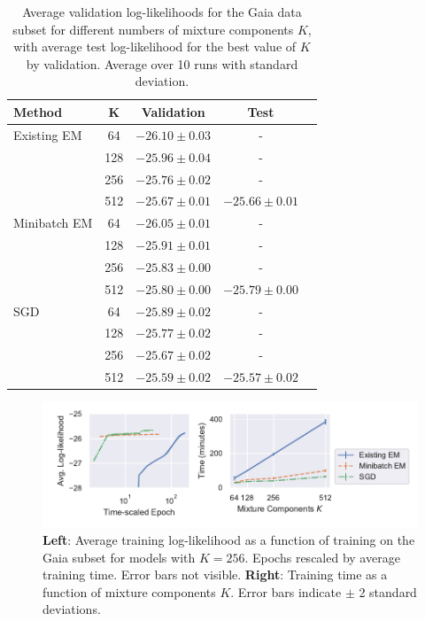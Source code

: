 \documentclass{article}
\begin{document}
\begin{table}{}
  \caption{Average validation log-likelihoods for the Gaia data subset for different numbers of mixture components $K$, with average test log-likelihood for the best value of $K$ by validation. Average over 10 runs with standard deviation.}
  \label{results-table}
  \centering
  \begin{tabular}{lcccc}
      \toprule
      Method     & K &  Validation     & Test\\
      \midrule
      Existing EM & 64 & $-26.10 \pm 0.03$ & - \\
      \citet{bovyExtremeDeconvolutionInferring2011} & 128 & $-25.96 \pm 0.04$ & - \\
       & 256 & $-25.76 \pm 0.02$ & - \\
       & 512 & $-25.67 \pm 0.01$ & $-25.66 \pm 0.01$ \\
      \midrule
      Minibatch EM & 64 & $-26.05 \pm 0.01$ & - \\
       & 128 & $-25.91 \pm 0.01$ & - \\
       & 256 & $-25.83 \pm 0.00$ & - \\
       & 512 & $-25.80 \pm 0.00$ & $-25.79 \pm 0.00$ \\
      \midrule
      SGD & 64 & $-25.89 \pm 0.02$ & - \\
       & 128 & $-25.77 \pm 0.02$ & - \\
       & 256 & $-25.67 \pm 0.02$ & - \\
       & 512 & $-25.59 \pm 0.02$ & $-25.57 \pm 0.02$ \\
      \bottomrule
  \end{tabular}
\end{table}

\begin{figure}
  \centering
  \includegraphics[width=\textwidth]{figures/learning.pdf}
  \caption{\textbf{Left}: Average training log-likelihood as a function of training on the Gaia subset for models with $K=256$. Epochs rescaled by average training time. Error bars not visible. \textbf{Right}: Training time as a function of mixture components $K$. Error bars indicate $\pm$ 2 standard deviations.}
  \label{fig:training}
\end{figure}
\end{document}
